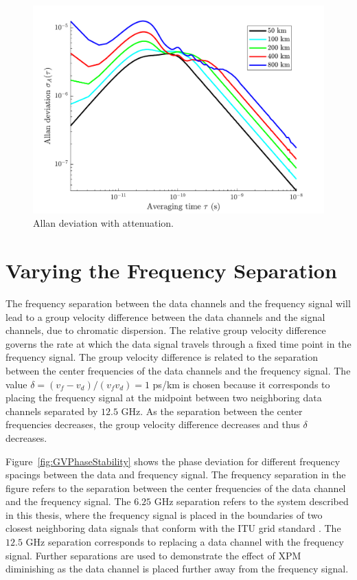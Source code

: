 \clearpage

%
\begin{figure}[htb]
	\raggedright
	\includegraphics[scale=0.8]{img/AAllanDev}
	\renewcommand{\baselinestretch}{1}
	\small\normalsize
	\caption{Allan deviation with attenuation.} \label{fig:AAllanDev}
\end{figure}
\renewcommand{\baselinestretch}{2}
\small\normalsize%


\section{Varying the Frequency Separation}

The frequency separation between the data channels and the frequency signal will lead to a group velocity difference between the data channels and the signal channels, due to chromatic dispersion. The relative group velocity difference governs the rate at which the data signal travels through a fixed time point in the frequency signal. The group velocity difference is related to the separation between the center frequencies of the data channels and the frequency signal. The value $\delta = (v_{f}-v_{d})/(v_fv_d) = 1$ ps/km is chosen because it corresponds to placing the frequency signal at the midpoint between two neighboring data channels separated by $12.5$ GHz. As the separation between the center frequencies decreases, the group velocity difference decreases and thus $\delta$ decreases. 

Figure~\ref{fig:GVPhaseStability} shows the phase deviation for different frequency spacings between the data and frequency signal. The frequency separation in the figure refers to the separation between the center frequencies of the data channel and the frequency signal. The $6.25$ GHz separation refers to the system described in this thesis, where the frequency signal is placed in the boundaries of two closest neighboring data signals that conform with the ITU grid standard \cite{ITU-T2012}. The $12.5$ GHz separation corresponds to replacing a data channel with the frequency signal. Further separations are used to demonstrate the effect of XPM diminishing as the data channel is placed further away from the frequency signal.

